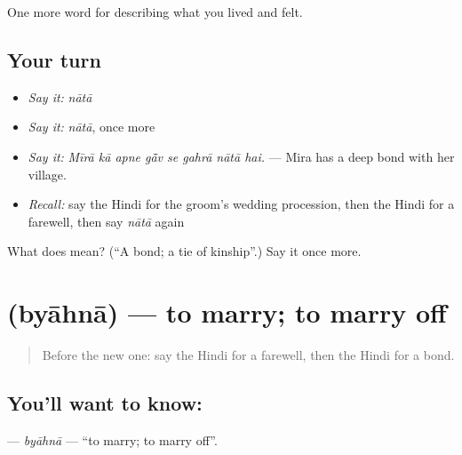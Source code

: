 \begin{grammarlens}[title={What you've built}]
One more word for describing what you lived and felt.
\end{grammarlens}

\subsection*{Your turn}
\begin{itemize}
\raggedright
  \item \emph{Say it:} \emph{nātā}
  \item \emph{Say it:} \emph{nātā}, once more
  \item \emph{Say it:} \emph{Mīrā kā apne gā̃v se gahrā nātā hai.} — Mira has a deep bond with her village.
  \item \emph{Recall:} say the Hindi for the groom's wedding procession, then the Hindi for a farewell, then say \emph{nātā} again
\end{itemize}

\begin{tcolorbox}[breakable,colback=teal!4,colframe=teal!35!black,title={Before you move on}]
What does  mean? (\textquotedblleft{}A bond; a tie of kinship\textquotedblright{}.) Say it once more.
\end{tcolorbox}
\section[\texorpdfstring{\hi{ब्याहना} (byāhnā)}{ब्याहना (byāhnā)}]{ (byāhnā) — to marry; to marry off}

\label{lesson:HI-C501-byahna}



\begin{quote}
Before the new one: say the Hindi for a farewell, then the Hindi for a bond.
\end{quote}

\subsection*{You'll want to know: }
\textbf{} — \emph{byāhnā} — \textquotedblleft{}to marry; to marry off\textquotedblright{}.

\begin{quote}
       
\end{quote}

